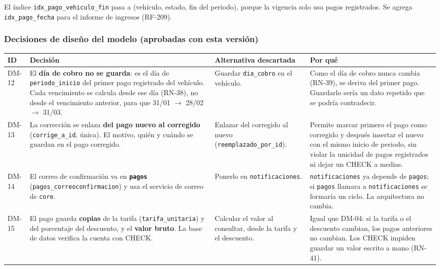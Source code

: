 El índice \texttt{idx\_pago\_vehiculo\_fin} pasa a (vehículo, estado, fin del periodo), porque la vigencia solo usa pagos registrados. Se agrega \texttt{idx\_pago\_fecha} para el informe de ingresos (RF-209).


\subsubsection{Decisiones de diseño del modelo (aprobadas con esta versión)}

\begin{longtable}{>{\raggedright\arraybackslash}p{1.5cm}>{\raggedright\arraybackslash}p{3.5cm}>{\raggedright\arraybackslash}p{4.2cm}>{\raggedright\arraybackslash}p{5.2cm}}
\toprule
\textbf{ID} & \textbf{Decisión} & \textbf{Alternativa descartada} & \textbf{Por qué}\\
\midrule\endhead
DM-12 & El \textbf{día de cobro no se guarda}: es el día de \texttt{periodo\_inicio} del primer pago registrado del vehículo. Cada vencimiento se calcula desde ese día (RN-38), no desde el vencimiento anterior, para que 31/01 $\rightarrow$ 28/02 $\rightarrow$ 31/03. & Guardar \texttt{dia\_cobro} en el vehículo. & Como el día de cobro nunca cambia (RN-39), se deriva del primer pago. Guardarlo sería un dato repetido que se podría contradecir.\\
DM-13 & La corrección se enlaza \textbf{del pago nuevo al corregido} (\texttt{corrige\_a\_id}, única). El motivo, quién y cuándo se guardan en el pago corregido. & Enlazar del corregido al nuevo (\texttt{reemplazado\_por\_id}). & Permite marcar primero el pago como corregido y después insertar el nuevo con el mismo inicio de periodo, sin violar la unicidad de pagos registrados ni dejar un CHECK a medias.\\
DM-14 & El correo de confirmación va en \textbf{\texttt{pagos}} (\texttt{pagos\_correoconfirmacion}) y usa el servicio de correo de \texttt{core}. & Ponerlo en \texttt{notificaciones}. & \texttt{notificaciones} ya depende de \texttt{pagos}; si \texttt{pagos} llamara a \texttt{notificaciones} se formaría un ciclo. La arquitectura no cambia.\\
DM-15 & El pago guarda \textbf{copias} de la tarifa (\texttt{tarifa\_unitaria}) y del porcentaje del descuento, y el \textbf{valor bruto}. La base de datos verifica la cuenta con CHECK. & Calcular el valor al consultar, desde la tarifa y el descuento. & Igual que DM-04: si la tarifa o el descuento cambian, los pagos anteriores no cambian. Los CHECK impiden guardar un valor escrito a mano (RN-41).\\

\end{longtable}
